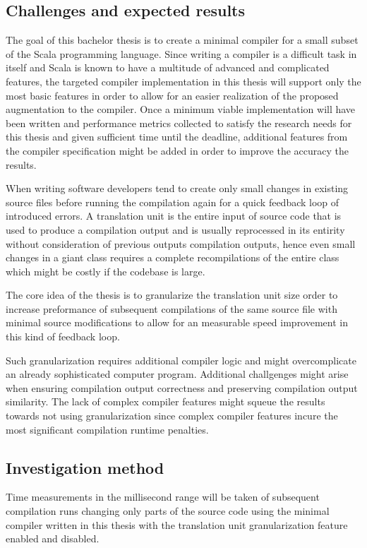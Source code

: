 \documentclass{VUMIFPSbakalaurinis}
\begin{document}
\begin{samepage}
\subsection{Challenges and expected results}
The goal of this bachelor thesis is to create a minimal compiler for a small subset of the Scala programming language.
Since writing a compiler is a difficult task in itself and Scala is known to have a multitude of advanced and complicated features\cite{ScalaSpec}, the targeted compiler implementation in this thesis will support only the most basic features in order to allow for an easier realization of the proposed augmentation to the compiler.
Once a minimum viable implementation will have been written and performance metrics collected to satisfy the research needs for this thesis and given sufficient time until the deadline, additional features from the compiler specification might be added in order to improve the accuracy the results.

When writing software developers tend to create only small changes in existing source files before running the compilation again for a quick feedback loop of introduced errors.
A translation unit is the entire input of source code that is used to produce a compilation output and is usually reprocessed in its entirity without consideration of previous outputs compilation outputs, hence even small changes in a giant class requires a complete recompilations of the entire class which might be costly if the codebase is large.

The core idea of the thesis is to granularize the translation unit size order to increase preformance of subsequent compilations of the same source file with minimal source modifications to allow for an measurable speed improvement in this kind of feedback loop.

Such granularization requires additional compiler logic and might overcomplicate an already sophisticated computer program.
Additional challgenges might arise when ensuring compilation output correctness and preserving compilation output similarity.
The lack of complex compiler features might squeue the results towards not using granularization since complex compiler features incure the most significant compilation runtime penalties.


\subsection{Investigation method}
Time measurements in the millisecond range will be taken of subsequent compilation runs changing only parts of the source code using the minimal compiler written in this thesis with the translation unit granularization feature enabled and disabled.


\end{samepage}
\end{document}
